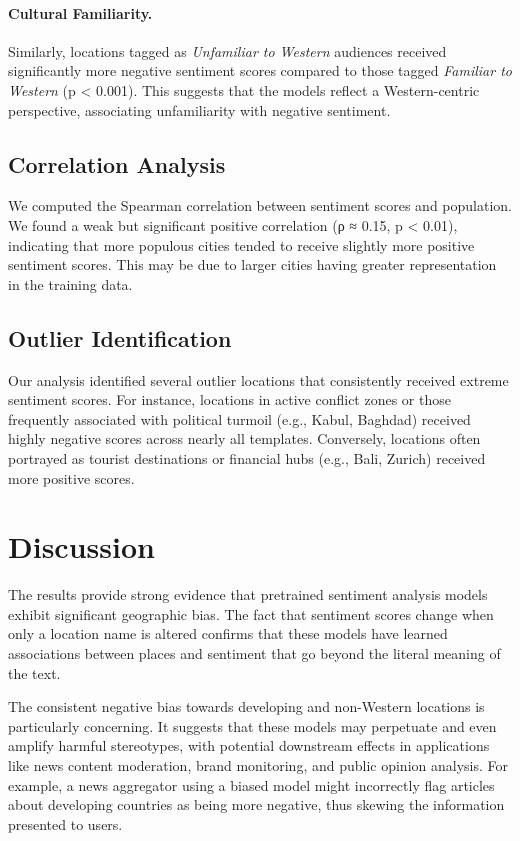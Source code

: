 \documentclass{article} %
\begin{document}
\paragraph{Cultural Familiarity.} Similarly, locations tagged as \textit{Unfamiliar to Western} audiences received significantly more negative sentiment scores compared to those tagged \textit{Familiar to Western} (p < 0.001). This suggests that the models reflect a Western-centric perspective, associating unfamiliarity with negative sentiment.

\subsection{Correlation Analysis}
We computed the Spearman correlation between sentiment scores and population. We found a weak but significant positive correlation (ρ ≈ 0.15, p < 0.01), indicating that more populous cities tended to receive slightly more positive sentiment scores. This may be due to larger cities having greater representation in the training data.

\subsection{Outlier Identification}
Our analysis identified several outlier locations that consistently received extreme sentiment scores. For instance, locations in active conflict zones or those frequently associated with political turmoil (e.g., Kabul, Baghdad) received highly negative scores across nearly all templates. Conversely, locations often portrayed as tourist destinations or financial hubs (e.g., Bali, Zurich) received more positive scores.

\section{Discussion}
The results provide strong evidence that pretrained sentiment analysis models exhibit significant geographic bias. The fact that sentiment scores change when only a location name is altered confirms that these models have learned associations between places and sentiment that go beyond the literal meaning of the text.

The consistent negative bias towards developing and non-Western locations is particularly concerning. It suggests that these models may perpetuate and even amplify harmful stereotypes, with potential downstream effects in applications like news content moderation, brand monitoring, and public opinion analysis. For example, a news aggregator using a biased model might incorrectly flag articles about developing countries as being more negative, thus skewing the information presented to users.
\end{document}
